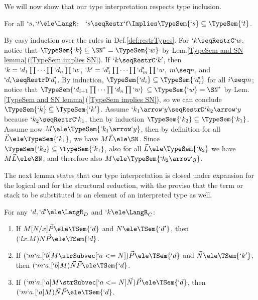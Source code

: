 \documentclass{CSML}
\newcommand{\vect}[1]{\vec{#1}}
\begin{document}
We will now show that our type interpretation respects type inclusion.

 \begin{lem} \label{closed for leq}
For all $`s, `t \ele \LangR $:~
$`s \seqRestr `t \Implies \TypeSem{`s} \subseteq \TypeSem{`t}$.
 \end{lem}

 \begin{Proof}
By easy induction over the rules in Def.\skp\ref{def:restrTypes}.
For $`k \seqRestrC `w$, notice that $\TypeSem{`k } \subseteq \SN^*= \TypeSem{`w}$ by Lem.\skp\ref{TypeSem and SN lemma}\,(\ref{TypeSem implies SN}). If $`k\seqRestrC `k'$, then $`k = `d_1\prod \cdots\prod `d_n\prod `w$, $`k' = `d'_1\prod \cdots\prod `d'_m\prod `w$, $m \seq n$, and $`d_i\seqRestrD`d'_i$.
By induction, $\TypeSem{`d_i} \subseteq \TypeSem{`d'_i}$ for all $i\seq m$; notice that $\TypeSem{`d_{i+1}\prod \cdots\prod `d_n\prod `w}$ $\subseteq \TypeSem{`w} =\SN^*$ by Lem.\skp\ref{TypeSem and SN lemma}\,(\ref{TypeSem implies SN}), so we can conclude $\TypeSem{`k }\subseteq\TypeSem{`k' }$.
Assume $`k _1\arrow `y \seqRestrD `k _2\arrow `y$ because $`k _2 \seqRestrC `k _1$, then by induction $\TypeSem{`k_2}\subseteq\TypeSem{`k_1}$.
Assume now $M \ele \TypeSem{`k _1\arrow `y}$, then by definition for all $\vect{L} \ele \TypeSem{`k_1}$, we have $M\vect{L} \ele \SN$. 
Since $ \TypeSem{`k_2} \subseteq\TypeSem{`k_1}$, also for all $\vect{L} \ele \TypeSem{`k_2}$ we have $M\vect{L} \ele \SN$, and therefore also $M \ele \TypeSem{`k _2\arrow `y}$.
 \end{Proof}

The next lemma states that our type interpretation is closed under expansion for the logical and for the structural reduction, with the proviso that the term or stack to be substituted is an element of an interpreted type as well.

 \begin{lem} \label{Typesem expansion} 
For any $`d, `d' \ele\LangR_D$ and $`k \ele\LangR_C$:
 \begin{enumerate}

 \item \label{Typesem expansion logical}
If $ M[N/x]\vect{P} \ele \TSem{`d} $ and $ N \ele \TSem{`d'} $, then $ ( `lx.M)N\vect{P} \ele \TSem{`d}$.

 \item \label{Typesem expansion structural in}
If $ (`m`a.[`b]M \strSubvec [ `a <= N ] )\vect{P} \ele \TSem{`d} $ and $\vect{N} \ele \TSem{`k' }$, then $ (`m`a.[`b]M) \vect{N} \vect{P} \ele \TSem{`d} $.

 \item \label{Typesem expansion structural out}
If $ (`m`a.[`a]M \strSubvec [ `a <= N ] \vect{N}) \vect{P} \ele \TSem{`d} $, then $ (`m`a.[`a]M) \vect{N} \vect{P} \ele \TSem{`d} $.

 \end{enumerate}
 \end{lem}
\end{document}
